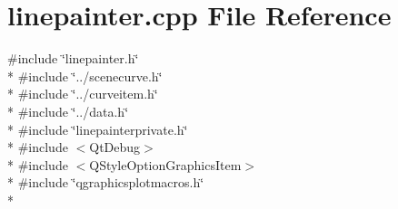 \section{linepainter.\+cpp File Reference}
\label{bk3_2curve_2painters_2linepainter_8cpp}
{\ttfamily \#include \char`\"{}linepainter.\+h\char`\"{}}\\*
{\ttfamily \#include \char`\"{}../scenecurve.\+h\char`\"{}}\\*
{\ttfamily \#include \char`\"{}../curveitem.\+h\char`\"{}}\\*
{\ttfamily \#include \char`\"{}../data.\+h\char`\"{}}\\*
{\ttfamily \#include \char`\"{}linepainterprivate.\+h\char`\"{}}\\*
{\ttfamily \#include $<$Qt\+Debug$>$}\\*
{\ttfamily \#include $<$Q\+Style\+Option\+Graphics\+Item$>$}\\*
{\ttfamily \#include \char`\"{}qgraphicsplotmacros.\+h\char`\"{}}\\*
